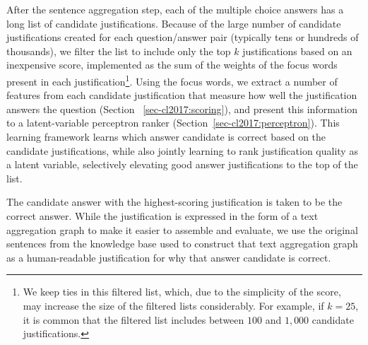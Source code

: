 After the sentence aggregation step, each of the multiple choice answers has a long list of candidate justifications.  Because of the large number of candidate justifications created for each question/answer pair (typically tens or hundreds of thousands), we filter the list to include only the top $k$ justifications based on an inexpensive score, implemented as the sum of the weights of the focus words present in each justification\footnote{We keep ties in this filtered list, which, due to the simplicity of the score, may increase the size of the filtered lists considerably. For example, if $k=25$, it is common that the filtered list includes between $100$ and $1,000$ candidate justifications.}. 
Using the focus words, we extract a number of features from each candidate justification that measure how well the justification answers the question (Section ~\ref{sec-cl2017:scoring}), and present this information to a latent-variable perceptron ranker (Section~\ref{sec-cl2017:perceptron}).  This learning framework learns which answer candidate is correct based on the candidate justifications, while also jointly learning to rank justification quality as a latent variable, selectively elevating good answer justifications to the top of the list.  

The candidate answer with the highest-scoring justification is taken to be the correct answer.  While the justification is expressed in the form of a text aggregation graph to make it easier to assemble and evaluate, we use the original sentences from the knowledge base used to construct that text aggregation graph as a human-readable justification for why that answer candidate is correct. 
